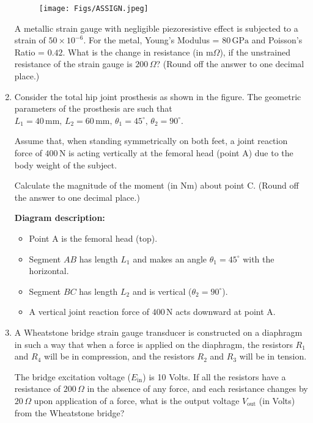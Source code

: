 \documentclass[journal]{IEEEtran}
\begin{document}
\begin{enumerate}
\begin{figure}[H]
    \centering
    \texttt{[image: Figs/ASSIGN.jpeg]}
    \caption{}
    \label{fig:placeholder}
\end{figure}
\hfill{}


A metallic strain gauge with negligible piezoresistive effect is subjected to a strain of \( 50 \times 10^{-6} \). For the metal, Young's Modulus = \( 80 \, \text{GPa} \) and Poisson's Ratio = \( 0.42 \). What is the change in resistance (in m\(\Omega\)), if the unstrained resistance of the strain gauge is \( 200 \, \Omega \)? (Round off the answer to one decimal place.)
\hfill{}

\item 
Consider the total hip joint prosthesis as shown in the figure. The geometric parameters of the prosthesis are such that 
\( L_1 = 40 \, \text{mm}, \, L_2 = 60 \, \text{mm}, \, \theta_1 = 45^\circ, \, \theta_2 = 90^\circ \). 

Assume that, when standing symmetrically on both feet, a joint reaction force of \( 400 \, \text{N} \) is acting vertically at the femoral head (point A) due to the body weight of the subject. 

Calculate the magnitude of the moment (in Nm) about point C. (Round off the answer to one decimal place.)


\textbf{Diagram description:}

\begin{itemize}
  \item Point A is the femoral head (top).
  \item Segment \( AB \) has length \( L_1 \) and makes an angle \( \theta_1 = 45^\circ \) with the horizontal.
  \item Segment \( BC \) has length \( L_2 \) and is vertical (\( \theta_2 = 90^\circ \)).
  \item A vertical joint reaction force of \( 400 \, \text{N} \) acts downward at point A.
\end{itemize}
\hfill{}

\item 
A Wheatstone bridge strain gauge transducer is constructed on a diaphragm in such a way that when a force is applied on the diaphragm, the resistors \( R_1 \) and \( R_4 \) will be in compression, and the resistors \( R_2 \) and \( R_3 \) will be in tension.

\vspace{1em}
The bridge excitation voltage (\( E_{\text{in}} \)) is 10 Volts. If all the resistors have a resistance of \( 200 \, \Omega \) in the absence of any force, and each resistance changes by \( 20 \, \Omega \) upon application of a force, what is the output voltage \( V_{\text{out}} \) (in Volts) from the Wheatstone bridge? 


\end{enumerate}
\end{document}
